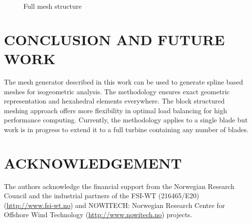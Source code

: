 \documentclass{nordic}
\begin{document}
\begin{figure}[h!]
\begin{subfigure}[b]{0.30\textwidth}
  \end{subfigure}
  \caption{Full mesh structure}
  \label{fig:full}
\end{figure}

\section{CONCLUSION AND FUTURE WORK}

The mesh generator described in this work can be used to generate spline based meshes for
isogeometric analysis. The methodology ensures exact geometric representation and hexahedral elements
everywhere. The block structured meshing approach offers more flexibility in optimal load balancing
for high performance computing. Currently, the methodology applies to a single blade but work is in
progress to extend it to a full turbine containing any number of blades.

\section{ACKNOWLEDGEMENT}

The authors acknowledge the financial support from the Norwegian Research Council and the industrial
partners of the FSI-WT (216465/E20) (\url{http://www.fsi-wt.no}) and NOWITECH: Norwegian Research Centre
for Offshore Wind Technology (\url{http://www.nowitech.no}) projects.



\end{document}

